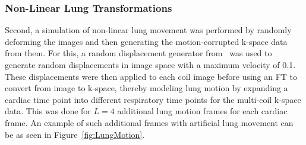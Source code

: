 \subsubsection{Non-Linear Lung Transformations}
Second, a simulation of non-linear lung movement was performed by randomly deforming the images and then generating the motion-corrupted k-space data from them. For this, a random displacement generator from~\cite{LAPNet} was used to generate random displacements in image space with a maximum velocity of 0.1. These displacements were then applied to each coil image before using an FT to convert from image to k-space, thereby modeling lung motion by expanding a cardiac time point into different respiratory time points for the multi-coil k-space data. This was done for $L=4$ additional lung motion frames for each cardiac frame. An example of such additional frames with artificial lung movement can be as seen in Figure~\ref{fig:LungMotion}.

